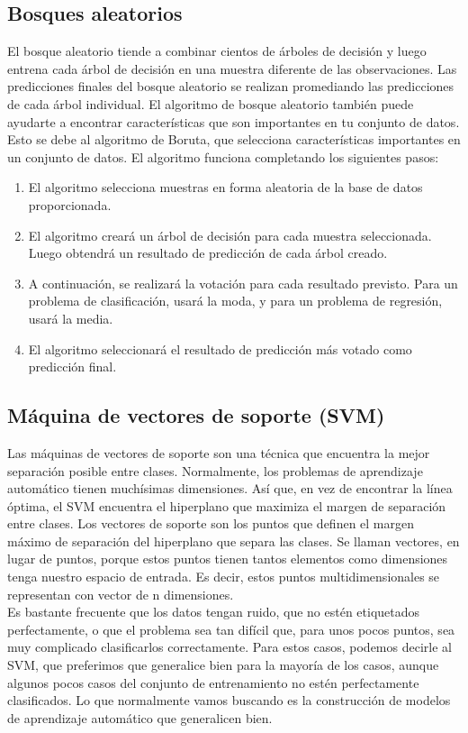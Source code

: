 \documentclass[conference]{IEEEtran}
\begin{document}
\subsection{Bosques aleatorios}
El bosque aleatorio tiende a combinar cientos de árboles de decisión y luego entrena cada árbol de decisión en una muestra diferente de las observaciones. Las predicciones finales del bosque aleatorio se realizan promediando las predicciones de cada árbol individual. El algoritmo de bosque aleatorio también puede ayudarte a encontrar características que son importantes en tu conjunto de datos. Esto se debe al algoritmo de Boruta, que selecciona características importantes en un conjunto de datos. El algoritmo funciona completando los siguientes pasos:
\begin{enumerate}
\item El algoritmo selecciona muestras en forma aleatoria de la base de datos proporcionada.
\item El algoritmo creará un árbol de decisión para cada muestra seleccionada. Luego obtendrá un resultado de predicción de cada árbol creado.
\item A continuación, se realizará la votación para cada resultado previsto. Para un problema de clasificación, usará la moda, y para un problema de regresión, usará la media.
\item El algoritmo seleccionará el resultado de predicción más votado como predicción final.
\end{enumerate}

\subsection{Máquina de vectores de soporte (SVM)}
Las máquinas de vectores de soporte son una técnica que encuentra la mejor separación posible entre clases. Normalmente, los problemas de aprendizaje automático tienen muchísimas dimensiones. Así que, en vez de encontrar la línea óptima, el SVM encuentra el hiperplano que maximiza el margen de separación entre clases. Los vectores de soporte son los puntos que definen el margen máximo de separación del hiperplano que separa las clases. Se llaman vectores, en lugar de puntos, porque estos puntos tienen tantos elementos como dimensiones tenga nuestro espacio de entrada. Es decir, estos puntos multidimensionales se representan con vector de n dimensiones.\\

Es bastante frecuente que los datos tengan ruido, que no estén etiquetados perfectamente, o que el problema sea tan difícil que, para unos pocos puntos, sea muy complicado clasificarlos correctamente. Para estos casos, podemos decirle al SVM, que preferimos que generalice bien para la mayoría de los casos, aunque algunos pocos casos del conjunto de entrenamiento no estén perfectamente clasificados. Lo que normalmente vamos buscando es la construcción de modelos de aprendizaje automático que generalicen bien. \\
\end{document}
